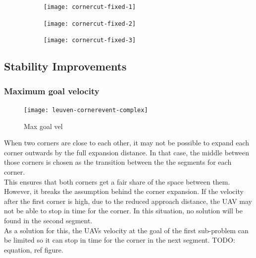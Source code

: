 \begin{figure}
	\centering
	\begin{subfigure}[t]{0.3\columnwidth}
        		\texttt{[image: cornercut-fixed-1]}
        		\caption{}
        		\label{fig:cc-fixed-1}
	\end{subfigure}
	\hfil
	\begin{subfigure}[t]{0.3\columnwidth}
        		\texttt{[image: cornercut-fixed-2]}
        		\caption{}
        		 \label{fig:cc-fixed-2}
	\end{subfigure}	
		\hfil
	\begin{subfigure}[t]{0.3\columnwidth}
        		\texttt{[image: cornercut-fixed-3]}
        		\caption{}
        		\label{fig:cc-fixed-3}
	\end{subfigure}
    \caption{}
    \label{fig:cc-fixed}     
\end{figure}

\subsection{Stability Improvements}

\subsubsection{Maximum goal velocity}
\begin{figure}[]
	\centering
	\texttt{[image: leuven-cornerevent-complex]}
	\caption{Max goal vel}
	\label{fig:max-goal-vel}
\end{figure}

When two corners are close to each other, it may not be possible to expand each corner outwards by the full expansion distance. In that case, the middle between those corners is chosen as the transition between the the segments for each corner. \\
This ensures that both corners get a fair share of the space between them. However, it breaks the assumption behind the corner expansion. If the velocity after the first corner is high, due to the reduced approach distance, the UAV may not be able to stop in time for the corner. In this situation, no solution will be found in the second segment. \\
As a solution for this, the UAVs velocity at the goal of the first sub-problem can be limited so it can stop in time for the corner in the next segment. TODO: equation, ref figure.

